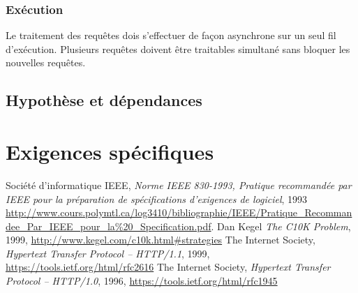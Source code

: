 \documentclass{scrreprt}
\begin{document}
\subsection{Exécution}
Le traitement des requêtes dois s'effectuer de façon asynchrone sur un seul fil d'exécution. Plusieurs requêtes doivent être traitables simultané sans bloquer les nouvelles requêtes.


\section{Hypothèse et dépendances}
\chapter{Exigences spécifiques}

\begin{thebibliography}{9}
  Société d'informatique IEEE,
\emph{Norme IEEE 830-1993, Pratique recommandée par IEEE pour la préparation de
spécifications d’exigences de logiciel}, 1993
\url{http://www.cours.polymtl.ca/log3410/bibliographie/IEEE/Pratique_Recommandee_Par_IEEE_pour_la%20_Specification.pdf}.
  Dan Kegel
\emph{The C10K Problem}, 1999, \url{http://www.kegel.com/c10k.html#strategies}
    The Internet Society,
\emph{Hypertext Transfer Protocol -- HTTP/1.1}, 1999,
\url{https://tools.ietf.org/html/rfc2616}
    The Internet Society,
\emph{Hypertext Transfer Protocol -- HTTP/1.0}, 1996,
\url{https://tools.ietf.org/html/rfc1945}
\end{thebibliography}


\end{document}

